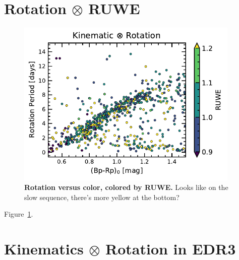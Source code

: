 \documentclass[12pt,twocolumn,tighten]{aastex63}
\begin{document}
\section{Rotation $\otimes$ RUWE}
\label{app:ruwe}

\begin{figure}[t]
	\begin{center}
		\leavevmode
		\includegraphics[width=0.95\textwidth]{f6.pdf}
	\end{center}
	\vspace{-0.7cm}
	\caption{ {\bf Rotation versus color, colored by RUWE.}
		Looks like on the slow sequence, there's more yellow at the bottom?
		\label{fig:rotn_X_RUWE}
	}
\end{figure}

Figure~\ref{fig:rotn_X_RUWE}.


\section{Kinematics $\otimes$ Rotation in EDR3}
\end{document}
